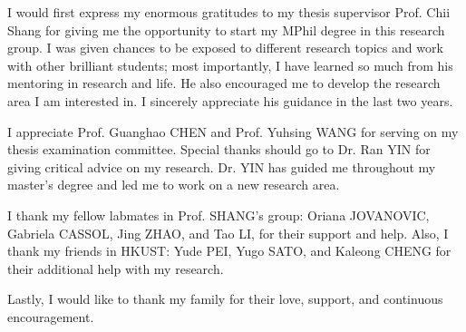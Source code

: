 \acknowledgments

I would first express my enormous gratitudes to my thesis supervisor Prof. Chii Shang for giving me the opportunity to start my MPhil degree in this research group. I was given chances to be exposed to different research topics and work with other brilliant students; most importantly, I have learned so much from his mentoring in research and life. He also encouraged me to develop the research area I am interested in. I sincerely appreciate his guidance in the last two years.

I appreciate Prof. Guanghao CHEN and Prof. Yuhsing WANG for serving on my thesis examination committee. Special thanks should go to Dr. Ran YIN for giving critical advice on my research. Dr. YIN has guided me throughout my master's degree and led me to work on a new research area.

I thank my fellow labmates in Prof. SHANG's group: Oriana JOVANOVIC, Gabriela CASSOL, Jing ZHAO, and Tao LI, for their support and help. Also, I thank my friends in HKUST: Yude PEI, Yugo SATO, and Kaleong CHENG for their additional help with my research.

Lastly, I would like to thank my family for their love, support, and continuous encouragement.

\endacknowledgments
 
